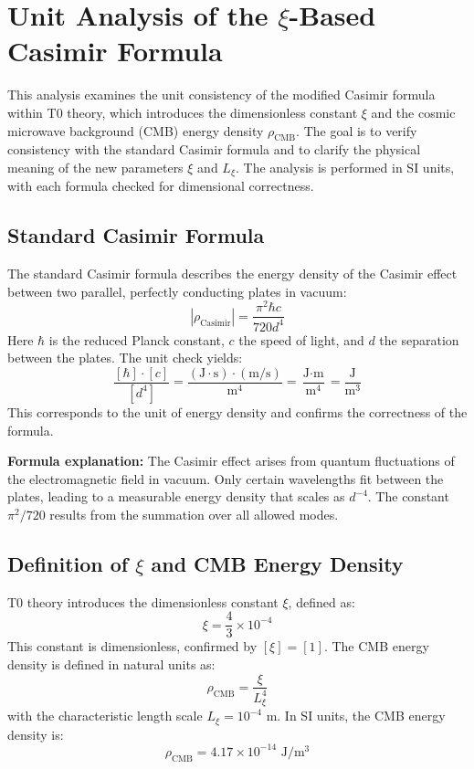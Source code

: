 	\section{Unit Analysis of the $\xi$-Based Casimir Formula}
	
	This analysis examines the unit consistency of the modified Casimir formula within T0 theory, which introduces the dimensionless constant $\xi$ and the cosmic microwave background (CMB) energy density $\rho_{\text{CMB}}$. The goal is to verify consistency with the standard Casimir formula and to clarify the physical meaning of the new parameters $\xi$ and $L_\xi$. The analysis is performed in SI units, with each formula checked for dimensional correctness.
	
	\subsection{Standard Casimir Formula}
	The standard Casimir formula describes the energy density of the Casimir effect between two parallel, perfectly conducting plates in vacuum:
	\begin{equation}
		|\rho_{\text{Casimir}}| = \frac{\pi^2 \hbar c}{720 d^4}
	\end{equation}
	Here $\hbar$ is the reduced Planck constant, $c$ the speed of light, and $d$ the separation between the plates. The unit check yields:
	\begin{equation}
		\frac{[\hbar] \cdot [c]}{[d^4]} = \frac{(\text{J} \cdot \text{s}) \cdot (\text{m}/\text{s})}{\text{m}^4} = \frac{\text{J} \cdot \text{m}}{\text{m}^4} = \frac{\text{J}}{\text{m}^3}
	\end{equation}
	This corresponds to the unit of energy density and confirms the correctness of the formula.
	
	\textbf{Formula explanation:} The Casimir effect arises from quantum fluctuations of the electromagnetic field in vacuum. Only certain wavelengths fit between the plates, leading to a measurable energy density that scales as $d^{-4}$. The constant $\pi^2/720$ results from the summation over all allowed modes.
	
	\subsection{Definition of $\xi$ and CMB Energy Density}
	T0 theory introduces the dimensionless constant $\xi$, defined as:
	\begin{equation}
		\xi = \frac{4}{3} \times 10^{-4}
	\end{equation}
	This constant is dimensionless, confirmed by $[\xi] = [1]$. The CMB energy density is defined in natural units as:
	\begin{equation}
		\rho_{\text{CMB}} = \frac{\xi}{L_\xi^4}
	\end{equation}
	with the characteristic length scale $L_\xi = 10^{-4}$ m. In SI units, the CMB energy density is:
	\begin{equation}
		\rho_{\text{CMB}} = 4.17 \times 10^{-14} \text{ J}/\text{m}^3
	\end{equation}
	
